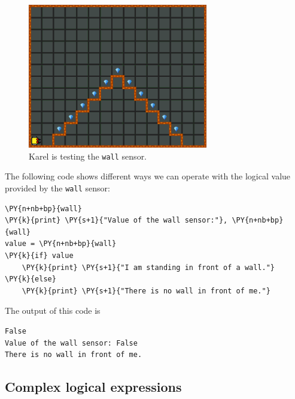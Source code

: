 \begin{figure}[!ht]
\begin{center}
\includegraphics[width=0.7\textwidth]{img/logic-1.png}
\end{center}
\vspace{-2mm}
\caption{Karel is testing the {\tt wall} sensor.}
\label{fig:logic1}
\end{figure}
\noindent
The following code shows different ways we can operate with the 
logical value provided by the {\tt wall} sensor:\\

\begin{bbox}
\begin{Verbatim}[commandchars=\\\{\}]
\PY{n+nb+bp}{wall}
\PY{k}{print} \PY{s+1}{"Value of the wall sensor:"}, \PY{n+nb+bp}{wall}
value = \PY{n+nb+bp}{wall}
\PY{k}{if} value
    \PY{k}{print} \PY{s+1}{"I am standing in front of a wall."}
\PY{k}{else}
    \PY{k}{print} \PY{s+1}{"There is no wall in front of me."}
\end{Verbatim}
\end{bbox}
\vspace{6mm}

\noindent
The output of this code is \\

\begin{ybox}
\begin{Verbatim}[commandchars=\\\{\}]
False
Value of the wall sensor: False
There is no wall in front of me.
\end{Verbatim}
\end{ybox}

\subsection[\ \ Complex logical expressions]{Complex logical expressions}

